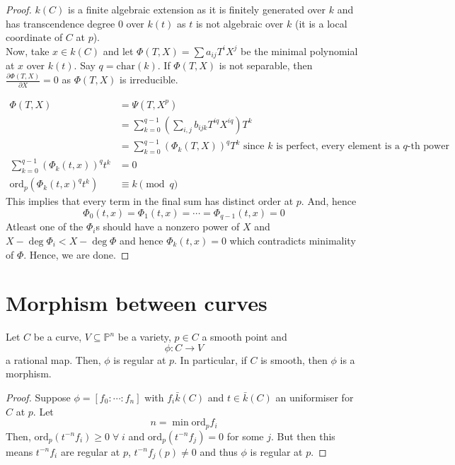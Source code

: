 \documentclass[oneside, 12pt]{scrbook}
\newcommand{\PP}{\mathbb{P}}
\newcommand{\ord}{\mathrm{ord}}
\theoremstyle{theorem}
\begin{document}
\begin{proof}
$k(C)$ is a finite algebraic extension as it is finitely generated over $k$ and has transcendence degree $0$ over $k(t)$ as $t$ is not algebraic over $k$ (it is a local coordinate of $C$ at $p$). \\

Now, take $x\in k(C)$ and let $\Phi(T,X) = \sum a_{ij}T^{i}X^{j}$ be the minimal polynomial at $x$ over $k(t)$. Say $q = \mathrm{char}(k)$. If $\Phi (T,X)$ is not separable, then $\frac{\partial \Phi(T,X)}{\partial X} = 0$ as $\Phi(T,X)$ is irreducible. 

\begin{align*}
\Phi(T,X) &= \Psi (T,X^p) \\
&= \sum_{k=0}^{q-1} \left( \sum_{i,j} b_{ijk} T^{iq} X^{iq} \right) T^k \\
&= \sum_{k=0}^{q-1} \left( \Phi_{k}(T,X) \right)^q T^k \text{     since $k$ is perfect, every element is a $q$-th power} \\
\sum_{k=0}^{q-1} \left( \Phi_{k}(t,x) \right)^q t^k &=0\\
\ord_{p} (\Phi_{k}(t,x)^q t^k) &\equiv k \pmod{q}
\end{align*}
This implies that every term in the final sum has distinct order at $p$. And, hence $$\Phi_{0}(t,x) = \Phi_{1}(t,x) = \cdots = \Phi_{q-1}(t,x) = 0$$ Atleast one of the $\Phi_{i}$s should have a nonzero power of $X$ and $X - \deg \Phi_{i} < X - \deg \Phi$ and hence $\Phi_{k}(t,x) =0$ which contradicts minimality of $\Phi$. Hence, we are done.
\end{proof}

\section{Morphism between curves}

\begin{proposition}
Let $C$ be a curve, $V \subseteq \PP^n$ be a variety, $p \in C$ a smooth point and $$\phi : C \rightarrow V$$ a rational map. Then, $\phi$ is regular at $p$. In particular, if $C$ is smooth, then $\phi$ is a morphism.
\end{proposition}

\begin{proof}
Suppose $\phi = [f_{0} : \cdots : f_{n}]$ with $f_{i} \bar{k}(C)$ and $t \in \bar{k}(C)$ an uniformiser for $C$ at $p$. Let $$n = \min \ord_{p} f_{i}$$ Then, $\ord_{p}(t^{-n}f_{i}) \geq 0 \; \forall \; i$ and $\ord_{p}(t^{-n}f_{j})=0$ for some $j$. But then this means $t^{-n}f_{i}$ are regular at $p$, $t^{-n}f_{j}(p) \neq 0$ and thus $\phi$ is regular at $p$.
\end{proof}
\end{document}

